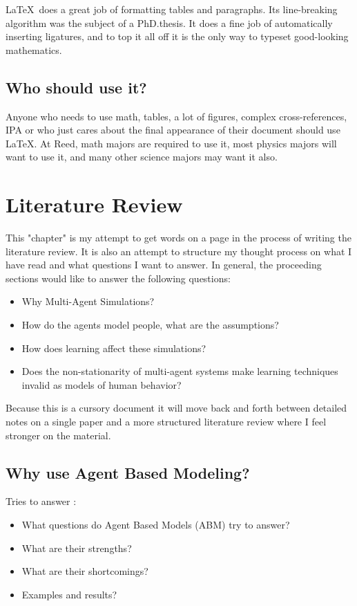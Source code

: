 \documentclass[12pt,twoside]{reedthesis}
\begin{document}
\LaTeX\ does a great job of formatting tables and paragraphs. Its line-breaking algorithm was the subject of a PhD.\thinspace thesis. It does a fine job of automatically inserting ligatures, and to top it all off it is the only way to typeset good-looking mathematics.

\section{Who should use it?}

Anyone who needs to use math, tables, a lot of figures, complex cross-references, IPA or who just cares about the final appearance of their document should use \LaTeX. At Reed, math majors are required to use it, most physics majors will want to use it, and many other science majors may want it also.

\chapter{Literature Review}
	This "chapter" is my attempt to get words on a page in the process of writing the literature review. It is also an attempt to structure my thought process on what I have read and what questions I want to answer. In general, the proceeding sections would like to answer the following questions:
	
	\begin{itemize}
		\item Why Multi-Agent Simulations?
		\item How do the agents model people, what are the assumptions?
		\item How does learning affect these simulations?
		\item Does the non-stationarity of multi-agent systems make learning techniques invalid as models of human behavior?
	\end{itemize}
	
	Because this is a cursory document it will move back and forth between detailed notes on a single paper and a more structured literature review where I feel stronger on the material.
	
\section{Why use Agent Based Modeling?}
	Tries to answer :
	\begin{itemize}
		\item What questions do Agent Based Models (ABM) try to answer?
		\item What are their strengths?
		\item What are their shortcomings?
		\item Examples and results?
	\end{itemize}
\end{document}
